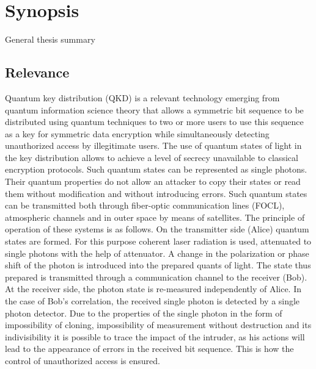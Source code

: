 \chapter*{Synopsis}
\renewcommand{\figurename}{Figure}
\renewcommand{\thefigure}{\arabic{figure}} %
\setcounter{figure}{0}                     %

\begin{center}
    General thesis summary
\end{center}

\section*{Relevance}
Quantum key distribution (QKD) is a relevant technology emerging from quantum information science theory that allows a symmetric bit sequence to be distributed using quantum techniques to two or more users to use this sequence as a key for symmetric data encryption while simultaneously detecting unauthorized access by illegitimate users. The use of quantum states of light in the key distribution allows to achieve a level of secrecy unavailable to classical encryption protocols. Such quantum states can be represented as single photons. Their quantum properties do not allow an attacker to copy their states or read them without modification and without introducing errors. Such quantum states can be transmitted both through fiber-optic communication lines (FOCL), atmospheric channels and in outer space by means of satellites. The principle of operation of these systems is as follows. On the transmitter side (Alice) quantum states are formed. For this purpose coherent laser radiation is used, attenuated to single photons with the help of attenuator. A change in the polarization or phase shift of the photon is introduced into the prepared quants of light. The state thus prepared is transmitted through a communication channel to the receiver (Bob). At the receiver side, the photon state is re-measured independently of Alice. In the case of Bob's correlation, the received single photon is detected by a single photon detector. Due to the properties of the single photon in the form of impossibility of cloning, impossibility of measurement without destruction and its indivisibility it is possible to trace the impact of the intruder, as his actions will lead to the appearance of errors in the received bit sequence. This is how the control of unauthorized access is ensured. 


